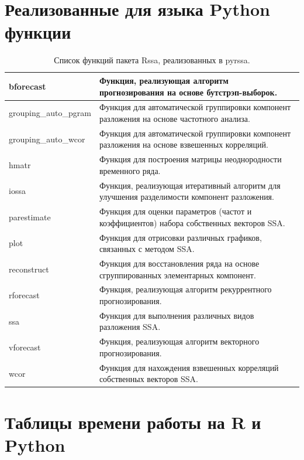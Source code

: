 \documentclass[specialist,
			   substylefile = spbu_report.rtx,
			   subf,href,colorlinks=true, 12pt]{disser}
\begin{document}
\makeatletter

\appendix

\chapter{Реализованные для языка Python функции}

\begin{table}[htp]
	\centering
	\begin{tabularx}{\textwidth}{| l | X |}
		
		
		\hline
		bforecast & Функция, реализующая алгоритм прогнозирования на основе бутстрэп-выборок. \\
		\hline
		grouping\_auto\_pgram & Функция для автоматической группировки компонент разложения на основе частотного анализа. \\
		\hline
		grouping\_auto\_wcor & Функция для автоматической группировки компонент разложения на основе взвешенных корреляций. \\
		\hline
		hmatr & Функция для построения матрицы неоднородности временного ряда. \\
		\hline
		iossa & Функция, реализующая итеративный алгоритм для улучшения разделимости компонент разложения. \\
		\hline
		parestimate & Функция для оценки параметров (частот и коэффициентов) набора собственных векторов SSA. \\
		\hline
		plot & Функция для отрисовки различных графиков, связанных с методом SSA.\\
		\hline
		reconstruct & Функция для восстановления ряда на основе сгруппированных элементарных компонент.\\
		\hline
		rforecast & Функция, реализующая алгоритм рекуррентного прогнозирования.\\
		\hline
		ssa & Функция для выполнения различных видов разложения SSA.\\
		\hline
		vforecast & Функция, реализующая алгоритм векторного прогнозирования.\\
		\hline
		wcor & Функция для нахождения взвешенных корреляций собственных векторов SSA.\\
		\hline
		 
	\end{tabularx}
	\caption{\label{tab:pyrssa-functions} Список функций пакета Rssa, реализованных в pyrssa.}
\end{table}


\chapter{Таблицы времени работы на R и Python}
\end{document}
